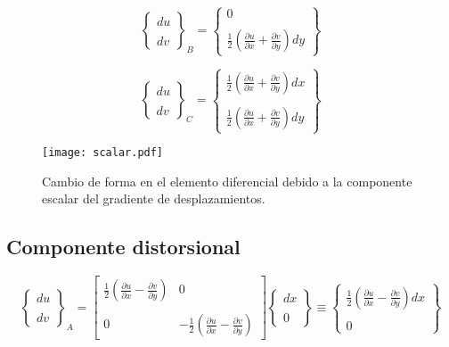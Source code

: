 \documentclass[../notas medios.tex]{subfiles}
\begin{document}
\[{\left\{ {\begin{array}{*{20}{c}}
{du}\\\\
{dv}
\end{array}} \right\}_B} = \left\{ {\begin{array}{*{20}{c}}
0\\\\
{\frac{1}{2}\left( {\frac{{\partial u}}{{\partial x}} + \frac{{\partial v}}{{\partial y}}} \right)dy}
\end{array}} \right\}\]

\[{\left\{ {\begin{array}{*{20}{c}}
{du}\\\\
{dv}
\end{array}} \right\}_C} = \left\{ {\begin{array}{*{20}{c}}
{\frac{1}{2}\left( {\frac{{\partial u}}{{\partial x}} + \frac{{\partial v}}{{\partial y}}} \right)dx}\\\\
{\frac{1}{2}\left( {\frac{{\partial u}}{{\partial x}} + \frac{{\partial v}}{{\partial y}}} \right)dy}
\end{array}} \right\}\]



\begin{figure}[H]
\centering
	\texttt{[image: scalar.pdf]}
	\caption{Cambio de forma en el elemento diferencial debido a la componente escalar del gradiente de desplazamientos.}
	\label{scalar}
\end{figure}

\subsection{Componente distorsional}

\[{\left\{ {\begin{array}{*{20}{c}}
{du}\\\\
{dv}
\end{array}} \right\}_A} = \left[ {\begin{array}{*{20}{c}}
{\frac{1}{2}\left( {\frac{{\partial u}}{{\partial x}} - \frac{{\partial v}}{{\partial y}}} \right)}&0\\\\
0&{ - \frac{1}{2}\left( {\frac{{\partial u}}{{\partial x}} - \frac{{\partial v}}{{\partial y}}} \right)}
\end{array}} \right]\left\{ {\begin{array}{*{20}{c}}
{dx}\\\\
0
\end{array}} \right\} \equiv \left\{ {\begin{array}{*{20}{c}}
{\frac{1}{2}\left( {\frac{{\partial u}}{{\partial x}} - \frac{{\partial v}}{{\partial y}}} \right)dx}\\\\
0
\end{array}} \right\}\]
\end{document}
